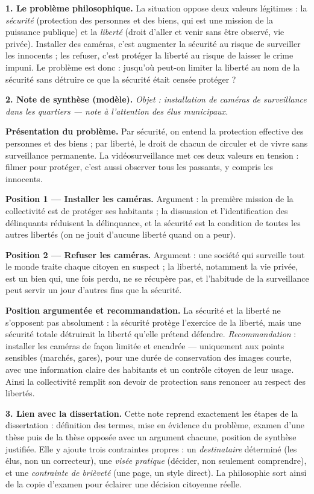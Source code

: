 \documentclass[11pt]{article}
\begin{document}
\begin{corrige}
\textbf{1. Le problème philosophique.}
La situation oppose deux valeurs légitimes : la \emph{sécurité} (protection des personnes et des biens, qui est une mission de la puissance publique) et la \emph{liberté} (droit d'aller et venir sans être observé, vie privée). Installer des caméras, c'est augmenter la sécurité au risque de surveiller les innocents ; les refuser, c'est protéger la liberté au risque de laisser le crime impuni. Le problème est donc : jusqu'où peut-on limiter la liberté au nom de la sécurité sans détruire ce que la sécurité était censée protéger ?

\textbf{2. Note de synthèse (modèle).}
\emph{Objet : installation de caméras de surveillance dans les quartiers — note à l'attention des élus municipaux.}

\textbf{Présentation du problème.} Par sécurité, on entend la protection effective des personnes et des biens ; par liberté, le droit de chacun de circuler et de vivre sans surveillance permanente. La vidéosurveillance met ces deux valeurs en tension : filmer pour protéger, c'est aussi observer tous les passants, y compris les innocents.

\textbf{Position 1 — Installer les caméras.} Argument : la première mission de la collectivité est de protéger ses habitants ; la dissuasion et l'identification des délinquants réduisent la délinquance, et la sécurité est la condition de toutes les autres libertés (on ne jouit d'aucune liberté quand on a peur).

\textbf{Position 2 — Refuser les caméras.} Argument : une société qui surveille tout le monde traite chaque citoyen en suspect ; la liberté, notamment la vie privée, est un bien qui, une fois perdu, ne se récupère pas, et l'habitude de la surveillance peut servir un jour d'autres fins que la sécurité.

\textbf{Position argumentée et recommandation.} La sécurité et la liberté ne s'opposent pas absolument : la sécurité protège l'exercice de la liberté, mais une sécurité totale détruirait la liberté qu'elle prétend défendre. \emph{Recommandation} : installer les caméras de façon limitée et encadrée — uniquement aux points sensibles (marchés, gares), pour une durée de conservation des images courte, avec une information claire des habitants et un contrôle citoyen de leur usage. Ainsi la collectivité remplit son devoir de protection sans renoncer au respect des libertés.

\textbf{3. Lien avec la dissertation.}
Cette note reprend exactement les étapes de la dissertation : définition des termes, mise en évidence du problème, examen d'une thèse puis de la thèse opposée avec un argument chacune, position de synthèse justifiée. Elle y ajoute trois contraintes propres : un \emph{destinataire} déterminé (les élus, non un correcteur), une \emph{visée pratique} (décider, non seulement comprendre), et une \emph{contrainte de brièveté} (une page, un style direct). La philosophie sort ainsi de la copie d'examen pour éclairer une décision citoyenne réelle.
\end{corrige}
\end{document}
